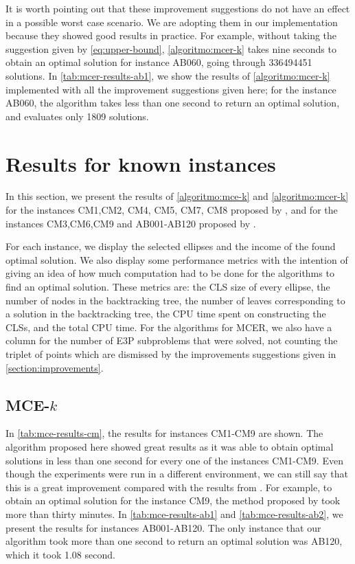 It is worth pointing out that these improvement suggestions do not have an effect in a possible worst case scenario. We are adopting them in our implementation because they showed good results in practice.
For example, without taking the suggestion given by \autoref{eq:upper-bound}, \autoref{algoritmo:mcer-k} takes nine seconds to obtain an optimal solution for instance AB060, going through \num{336494451} solutions.
In \autoref{tab:mcer-results-ab1}, we show the results of \autoref{algoritmo:mcer-k} implemented with all the improvement suggestions given here; for the instance AB060, the algorithm takes less than one second to return an optimal solution, and evaluates only \num{1809} solutions.

\section{Results for known instances}

In this section, we present the results of \autoref{algoritmo:mce-k} and \autoref{algoritmo:mcer-k} for the instances CM1,CM2, CM4, CM5, CM7, CM8 proposed by , and for the instances CM3,CM6,CM9 and AB001-AB120 proposed by .

For each instance, we display the selected ellipses and the income of the found optimal solution. 
We also display some performance metrics with the intention of giving an idea of how much computation had to be done for the algorithms to find an optimal solution. These metrics are: 
the CLS size of every ellipse, the number of nodes in the backtracking tree, the number of leaves corresponding to a solution in the backtracking tree, the CPU time spent on constructing the CLSs, and the total CPU time.
For the algorithms for MCER, we also have a column for the number of E3P subproblems that were solved, not counting the triplet of points which are dismissed by the improvements suggestions given in \autoref{section:improvements}.


\subsection{MCE-$k$}

In \autoref{tab:mce-results-cm}, the results for instances CM1-CM9 are shown. 
The algorithm proposed here showed great results as it was able to obtain optimal solutions in less than one second for every one of the instances CM1-CM9.
Even though the experiments were run in a different environment, we can still say that this is a great improvement compared with the results from . For example, to obtain an optimal solution for the instance CM9, the method proposed by  took more than thirty minutes.
In \autoref{tab:mce-results-ab1} and \autoref{tab:mce-results-ab2}, we present the results for instances AB001-AB120. The only instance that our algorithm took more than one second to return an optimal solution was AB120, which it took 1.08 second.

